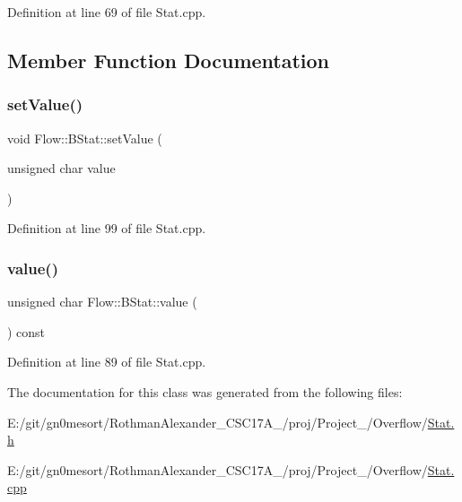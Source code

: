Definition at line 69 of file Stat.\+cpp.



\subsection{Member Function Documentation}
\hypertarget{class_flow_1_1_b_stat_a5613f2ccceaaa1c1b254061b398ec1f0}{}\label{class_flow_1_1_b_stat_a5613f2ccceaaa1c1b254061b398ec1f0} 
\subsubsection{\texorpdfstring{set\+Value()}{setValue()}}
{\footnotesize\ttfamily void Flow\+::\+B\+Stat\+::set\+Value (\begin{DoxyParamCaption}\item[{unsigned char}]{value }\end{DoxyParamCaption})}



Definition at line 99 of file Stat.\+cpp.

\hypertarget{class_flow_1_1_b_stat_a38ea6d1d87c1f5fa7951d79bae499e5e}{}\label{class_flow_1_1_b_stat_a38ea6d1d87c1f5fa7951d79bae499e5e} 
\subsubsection{\texorpdfstring{value()}{value()}}
{\footnotesize\ttfamily unsigned char Flow\+::\+B\+Stat\+::value (\begin{DoxyParamCaption}{ }\end{DoxyParamCaption}) const}



Definition at line 89 of file Stat.\+cpp.



The documentation for this class was generated from the following files\+:\begin{DoxyCompactItemize}
\item 
E\+:/git/gn0mesort/\+Rothman\+Alexander\+\_\+\+C\+S\+C17\+A\+\_/proj/\+Project\+\_/\+Overflow/\hyperlink{_stat_8h}{Stat.\+h}\item 
E\+:/git/gn0mesort/\+Rothman\+Alexander\+\_\+\+C\+S\+C17\+A\+\_/proj/\+Project\+\_/\+Overflow/\hyperlink{_stat_8cpp}{Stat.\+cpp}\end{DoxyCompactItemize}
